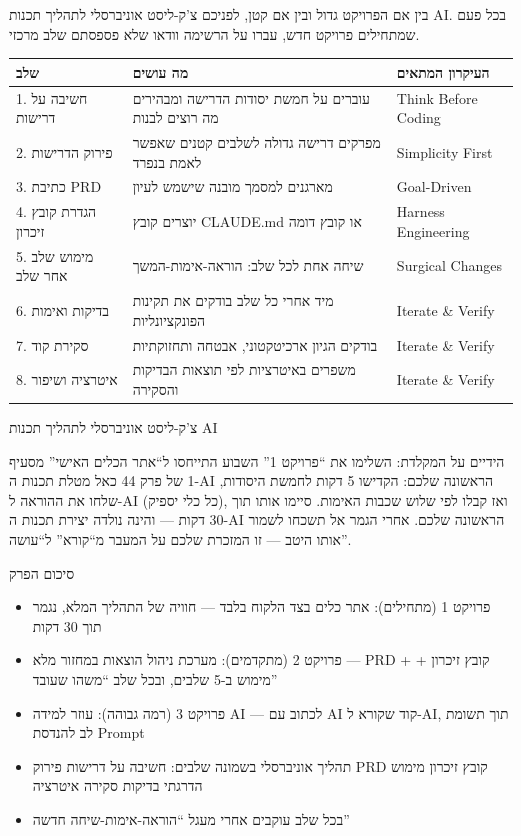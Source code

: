 בין אם הפרויקט גדול ובין אם קטן, לפניכם צ'ק-ליסט אוניברסלי לתהליך תכנות AI. בכל פעם שמתחילים פרויקט חדש, עברו על הרשימה וודאו שלא פספסתם שלב מרכזי.

\begin{center}
\begin{tabularx}{\linewidth}{|X|X|X|}
\hline
\textbf{שלב} & \textbf{מה עושים} & \textbf{העיקרון המתאים} \tabularnewline
\hline
1. חשיבה על דרישות & עוברים על חמשת יסודות הדרישה ומבהירים מה רוצים לבנות & Think Before Coding \tabularnewline
2. פירוק הדרישות & מפרקים דרישה גדולה לשלבים קטנים שאפשר לאמת בנפרד & Simplicity First \tabularnewline
3. כתיבת PRD & מארגנים למסמך מובנה שישמש לעיון & Goal-Driven \tabularnewline
4. הגדרת קובץ זיכרון & יוצרים קובץ CLAUDE.md או קובץ דומה & Harness Engineering \tabularnewline
5. מימוש שלב אחר שלב & שיחה אחת לכל שלב: הוראה-אימות-המשך & Surgical Changes \tabularnewline
6. בדיקות ואימות & מיד אחרי כל שלב בודקים את תקינות הפונקציונליות & Iterate \& Verify \tabularnewline
7. סקירת קוד & בודקים הגיון ארכיטקטוני, אבטחה ותחזוקתיות & Iterate \& Verify \tabularnewline
8. איטרציה ושיפור & משפרים באיטרציות לפי תוצאות הבדיקות והסקירה & Iterate \& Verify \tabularnewline
\hline
\end{tabularx}
\end{center}

\begin{center}\small\color{gray}צ'ק-ליסט אוניברסלי לתהליך תכנות AI\end{center}

\begin{tcbpractice}{הידיים על המקלדת: השלימו את “פרויקט 1” השבוע}
התייחסו ל“אתר הכלים האישי” מסעיף 1 של פרק 44 כאל מטלת תכנות ה-AI הראשונה שלכם: הקדישו 5 דקות לחמשת היסודות, שלחו את ההוראה ל-AI (כל כלי יספיק), ואז קבלו לפי שלוש שכבות האימות. סיימו אותו תוך 30 דקות — והינה נולדה יצירת תכנות ה-AI הראשונה שלכם. אחרי הגמר אל תשכחו לשמור אותו היטב — זו המזכרת שלכם על המעבר מ“קורא” ל“עושה”.

\end{tcbpractice}

\begin{tcbsummary}{סיכום הפרק}
\begin{itemize}
  \item פרויקט 1 (מתחילים): אתר כלים בצד הלקוח בלבד — חוויה של התהליך המלא, נגמר תוך 30 דקות
  \item פרויקט 2 (מתקדמים): מערכת ניהול הוצאות במחזור מלא — PRD + קובץ זיכרון + מימוש ב-5 שלבים, ובכל שלב “משהו שעובד”
  \item פרויקט 3 (רמה גבוהה): עוזר למידה AI — לכתוב עם AI קוד שקורא ל-AI, תוך תשומת לב להנדסת Prompt
  \item תהליך אוניברסלי בשמונה שלבים: חשיבה על דרישות פירוק PRD קובץ זיכרון מימוש הדרגתי בדיקות סקירה איטרציה
  \item בכל שלב עוקבים אחרי מעגל “הוראה-אימות-שיחה חדשה”
\end{itemize}

\end{tcbsummary}
